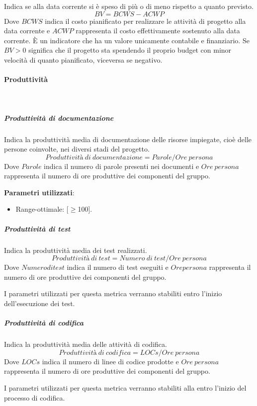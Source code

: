 			Indica se alla data corrente si è speso di più o di meno rispetto a quanto previsto.
			\[
			BV = BCWS - ACWP
			\]
			Dove $BCWS$ indica il costo pianificato per realizzare le attività di  progetto alla  data corrente e $ACWP$ rappresenta il costo effettivamente sostenuto alla data  corrente.
			È un indicatore che ha un valore unicamente contabile e finanziario. Se $BV>0$ significa che il progetto sta spendendo il proprio budget con minor velocità di quanto pianificato, viceversa se negativo.

			\paragraph{Produttività} \mbox{} \\

				\subparagraph{Produttività di documentazione}
				Indica la produttività media di documentazione delle risorse impiegate, cioè delle persone coinvolte, nei diversi stadi del progetto.
				\[
				Produttività\ di\ documentazione = Parole / Ore\ persona
				\]
				Dove $Parole$ indica il numero di parole presenti nei documenti e $Ore\ persona$ rappresenta il numero di ore produttive dei componenti del gruppo.
				
				\textbf{Parametri utilizzati}:
				\begin{itemize}
					\item Range-ottimale: [$\ge$100].
				\end{itemize}

				\subparagraph{Produttività di test}
				Indica la produttività media dei test realizzati.
				\[
				Produttività\ di\ test = Numero\ di\ test / Ore\ persona
				\]
				Dove $Numero di test$ indica il numero di test eseguiti e $Ore persona$ rappresenta il numero di ore produttive dei componenti del gruppo.
				
				I parametri utilizzati per questa metrica verranno stabiliti entro l'inizio dell'esecuzione dei test.

				\subparagraph{Produttività di codifica}
				Indica la produttività media delle attività di codifica.
				\[
				Produttività\ di\ codifica = LOCs / Ore\ persona
				\]
				Dove $LOCs$ indica il numero di linee di codice prodotte e $Ore\ persona$ rappresenta il numero di ore produttive dei componenti del gruppo.
				
				I parametri utilizzati per questa metrica verranno stabiliti alla entro l'inizio del processo di codifica.

